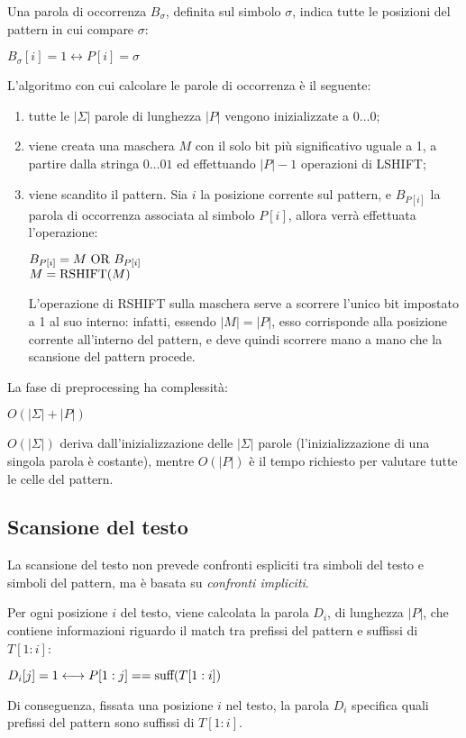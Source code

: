 Una parola di occorrenza $B_{\sigma}$, definita sul simbolo $\sigma$, indica tutte le posizioni del pattern in cui compare $\sigma$:
\begin{center}
    $B_{\sigma}[i] = 1 \longleftrightarrow P[i] = \sigma$
\end{center}
L'algoritmo con cui calcolare le parole di occorrenza è il seguente:
\begin{enumerate}
    \item tutte le $|\Sigma|$ parole di lunghezza $|P|$ vengono inizializzate a $0\ldots0$;
    \item viene creata una maschera $M$ con il solo bit più significativo uguale a 1, a partire dalla stringa $0\ldots01$ ed effettuando $|P| - 1$ operazioni di LSHIFT;
    \item viene scandito il pattern.
    Sia $i$ la posizione corrente sul pattern, e $B_{P[i]}$ la parola di occorrenza associata al simbolo $P[i]$, allora verrà effettuata l'operazione:
    \begin{center}
        $B_{P[i]} = M \textnormal{ OR } B_{P[i]}$\\
        $M = \textnormal{RSHIFT}(M)$
    \end{center}
    L'operazione di RSHIFT sulla maschera serve a scorrere l'unico bit impostato a 1 al suo interno: infatti, essendo $|M| = |P|$, esso corrisponde alla posizione corrente all'interno del pattern, e deve quindi scorrere mano a mano che la scansione del pattern procede.
\end{enumerate}
La fase di preprocessing ha complessità:
\begin{center}
    $O(|\Sigma| + |P|)$
\end{center}
$O(|\Sigma|)$ deriva dall'inizializzazione delle $|\Sigma|$ parole (l'inizializzazione di una singola parola è costante), mentre $O(|P|)$ è il tempo richiesto per valutare tutte le celle del pattern.

\subsection*{Scansione del testo}
La scansione del testo non prevede confronti espliciti tra simboli del testo e simboli del pattern, ma è basata su \textit{confronti impliciti}.

Per ogni posizione $i$ del testo, viene calcolata la parola $D_i$, di lunghezza $|P|$, che contiene informazioni riguardo
il match tra prefissi del pattern e suffissi di $T[1:i]$:
\begin{center}
    $D_i[j] = 1 \longleftrightarrow P[1:j] == \textnormal{suff}(T[1:i])$
\end{center}
Di conseguenza, fissata una posizione $i$ nel testo, la parola $D_i$ specifica quali prefissi del pattern sono suffissi di $T[1:i]$.

